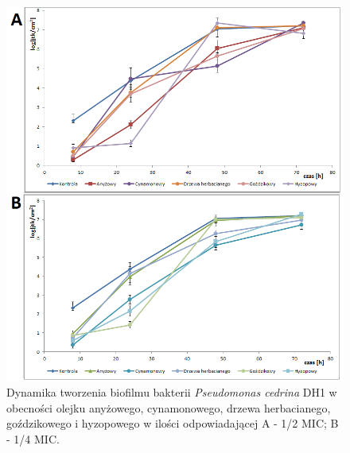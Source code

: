\documentclass[11pt,a4paper]{report}
\begin{document}
\begin{figure}[!h]
\begin{center}
\includegraphics[scale=0.65]{img/pc-a.png}
\caption{Dynamika tworzenia biofilmu bakterii \textit{Pseudomonas cedrina} DH1 w obecności olejku anyżowego, cynamonowego, drzewa herbacianego, goździkowego i hyzopowego w ilości odpowiadającej A - 1/2 MIC; B - 1/4 MIC.}\label{pc-a}
\end{center} 
\end{figure}
\end{document}
